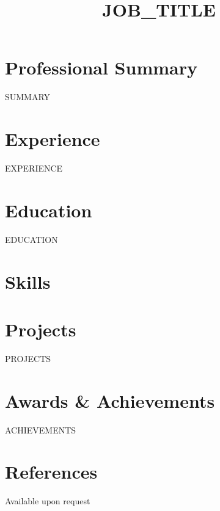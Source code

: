 \documentclass[11pt,a4paper,sans]{moderncv}
\title{{{JOB_TITLE}}}
\begin{document}
\makecvtitle

\section{Professional Summary}
{{SUMMARY}}

\section{Experience}
{{EXPERIENCE}}

\section{Education}
{{EDUCATION}}

\section{Skills}

\section{Projects}
{{PROJECTS}}

\section{Awards \& Achievements}
{{ACHIEVEMENTS}}

\section{References}
Available upon request
\end{document}
